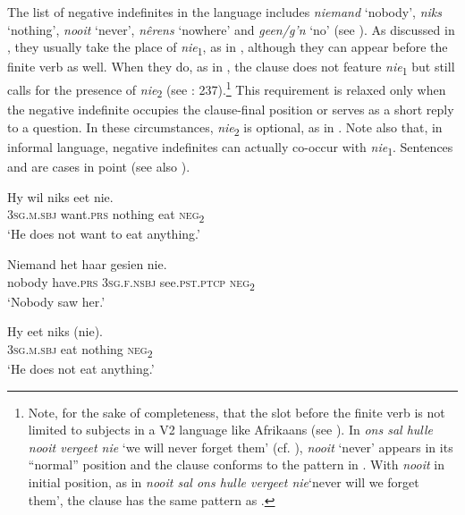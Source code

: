 \documentclass[output=paper,colorlinks,citecolor=brown]{langscibook}
\begin{document}
The list of negative indefinites in the language includes \textit{niemand} ‘nobody’, \textit{niks} ‘nothing’, \textit{nooit} ‘never’, \textit{nêrens} ‘nowhere’ and \textit{geen/g’n} ‘no’ (see \citealt{Huddlestone2010}). As discussed in , they usually take the place of \textit{nie}\textsubscript{1}, as in , although they can appear before the finite verb as well. When they do, as in , the clause does not feature \textit{nie}\textsubscript{1} but still calls for the presence of \textit{nie}\textsubscript{2} (see \citealt{OlmenBreed2015}: 237).\footnote{Note, for the sake of completeness, that the slot before the finite verb is not limited to subjects in a V2 language like Afrikaans (see ). In \textit{ons sal hulle nooit vergeet nie} ‘we will never forget them’ (cf. ), \textit{nooit} ‘never’ appears in its “normal” position and the clause conforms to the pattern in . With \textit{nooit} in initial position, as in \textit{nooit sal ons hulle vergeet nie}‘never will we forget them’, the clause has the same pattern as .} This requirement is relaxed only when the negative indefinite occupies the clause-final position or serves as a short reply to a question. In these circumstances, \textit{nie}\textsubscript{2} is optional, as in . Note also that, in informal language, negative indefinites can actually co-occur with \textit{nie}\textsubscript{1}. Sentences  and  are cases in point (see also \citealt[102--103]{Biberauer2009}).


\ea\label{ex:afr:28}
    \ea\label{ex:afr:28a}
        \gll Hy wil niks eet nie. \\ 
             3\textsc{sg.m.sbj} want\textsc{.prs} nothing eat \textsc{neg}\textsubscript{2} \\
        \glt ‘He does not want to eat anything.’
    
    \ex\label{ex:afr:28b}
        \gll Niemand het haar gesien nie. \\
             nobody have.\textsc{prs} \textsc{3sg.f.nsbj} see.\textsc{pst.ptcp} \textsc{neg}\textsubscript{2}\\
        \glt ‘Nobody saw her.’

    \ex\label{ex:afr:28c}
        \gll Hy eet niks (nie). \\ 
             3\textsc{sg.m.sbj} eat nothing \textsc{neg}\textsubscript{2} \\
        \glt ‘He does not eat anything.’
    
\end{document}
